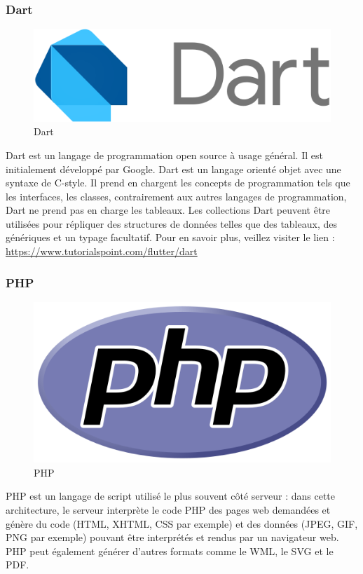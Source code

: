 \subsubsection{Dart}
\begin{figure}[h]
	\includegraphics[scale=0.4]{./Template LaTeX/Images/Dart_programming_language_logo.svg.png}
	\centering
	\caption{Dart}
\end{figure}
Dart est un langage de programmation open source à usage général. Il est initialement développé par Google. Dart est un langage orienté objet avec une syntaxe de C-style. Il prend en chargent les concepts de programmation tels que les interfaces, les classes, contrairement aux autres langages de programmation, Dart ne prend pas en charge les tableaux.
Les collections Dart peuvent être utilisées pour répliquer des structures de données telles que des tableaux, des génériques et un typage facultatif.
\newline Pour en savoir plus, veillez
visiter le lien : \href{https://www.tutorialspoint.com/flutter/flutter_introduction_to_dart_programming.htm}{https://www.tutorialspoint.com/flutter/dart}
\subsubsection{PHP}
\begin{figure}[h]
	\includegraphics[scale=0.3]{./Template LaTeX/Images/PHP-logo.svg.png}
	\centering
	\caption{PHP}
\end{figure}
PHP est un langage de script utilisé le plus souvent côté serveur : dans cette architecture, le serveur interprète le code PHP des pages web demandées et génère du code (HTML, XHTML, CSS par exemple) et des données (JPEG, GIF, PNG par exemple) pouvant être interprétés et rendus par un navigateur web. PHP peut également générer d'autres formats comme le WML, le SVG et le PDF.

